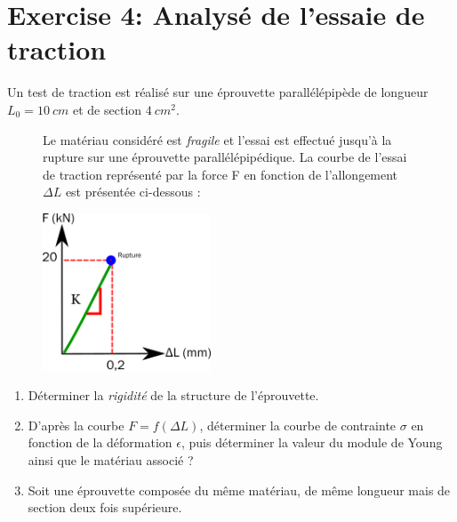 \documentclass[
]{article}
\providecommand{\tightlist}{%
  \setlength{\itemsep}{0pt}\setlength{\parskip}{0pt}}\usepackage{longtable,booktabs,array}
\begin{document}
\hypertarget{exercise-4-analysuxe9-de-lessaie-de-traction}{%
\section{Exercise 4: Analysé de l'essaie de
traction}\label{exercise-4-analysuxe9-de-lessaie-de-traction}}

Un test de traction est réalisé sur une éprouvette parallélépipède de
longueur \(L_{0}= 10~cm\) et de section \(4~cm^{2}\).

\begin{figure}

\begin{minipage}[c]{0.50\linewidth}

{\centering 

Le matériau considéré est \emph{fragile} et l'essai est effectué jusqu'à
la rupture sur une éprouvette parallélépipédique. La courbe de l'essai
de traction représenté par la force F en fonction de l'allongement
\(\Delta L\) est présentée ci-dessous :

}

\end{minipage}%
%
\begin{minipage}[c]{0.50\linewidth}

{\centering 

\includegraphics[width=5cm,height=\textheight]{../assets/img/TD1/Ex4.png}

}

\end{minipage}%

\end{figure}

\begin{enumerate}
\def\labelenumi{\arabic{enumi}.}
\tightlist
\item
  Déterminer la \emph{rigidité} de la structure de l'éprouvette.
\item
  D'après la courbe \(F=f(\Delta L)\), déterminer la courbe de
  contrainte \(\sigma\) en fonction de la déformation \(\epsilon\), puis
  déterminer la valeur du module de Young ainsi que le matériau associé
  ?
\item
  Soit une éprouvette composée du même matériau, de même longueur mais
  de section deux fois supérieure.
\end{enumerate}
\end{document}
